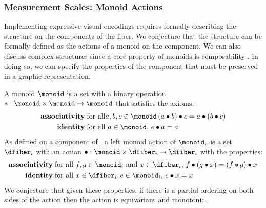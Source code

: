 \documentclass[../main.tex]{subfiles}
\begin{document}
\subsubsection{Measurement Scales: Monoid Actions}
\label{sec:math:data:monoid}
Implementing expressive visual encodings requires formally describing the structure on the components of the fiber. We conjecture that the structure can be formally defined as the actions of a monoid on the component. We can also discuss complex structures since a core property of monoids is composability \cite{yorgeyMonoidsThemeVariations}. In doing so, we can specify the properties of the component that must be preserved in a graphic representation. 


A monoid \cite{Monoid2021} $\monoid$ is a set with a binary operation $\ast:\monoid \times \monoid\rightarrow \monoid$ that satisfies the axioms:
\begin{align*}
    \textbf{associativity}\; & \text{for all} a, b, c \in \monoid \, (a \bullet b) \bullet c = a \bullet (b \bullet c)\\
    \textbf{identity}\; & \text{for all } a\in \monoid,\,  e\bullet a = a 
\end{align*} 
As defined on a component of \dfiber, a left monoid action \cite{SemigroupAction2021,nlab:action} of $\monoid_i$ is a set $\dfiber_i$ with an action $\bullet: \monoid\times \dfiber_i \rightarrow \dfiber_i$ with the properties:
\begin{align*}
    \textbf{associativity}\;& \text{for all } f,g \in \monoid_i \text{ and } x\in \dfiber_i,\, f\bullet(g\bullet x) = (f\ast g) \bullet x\\
    \textbf{identity}\;& \text{for all } x\in \dfiber_i, e\in \monoid_i,\,  e\bullet x = x 
\end{align*}
We conjecture that given these properties, if there is a partial ordering on both sides of the action then the action is equivariant and monotonic.
\end{document}
